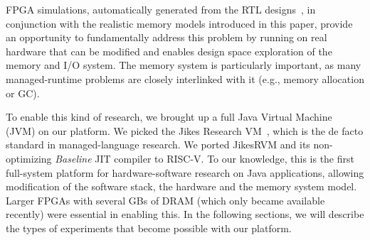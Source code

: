 FPGA simulations, automatically generated from the RTL designs~\cite{strober},
in conjunction with the realistic memory models introduced in this paper,
provide an opportunity to fundamentally address this problem by running on real
hardware that can be modified and enables design space exploration of the
memory and I/O system. The memory system is particularly important, as many
managed-runtime problems are closely interlinked with it (e.g., memory
allocation or GC).

To enable this kind of research, we brought up a full Java Virtual Machine
(JVM) on our platform. We picked the Jikes Research
VM~\cite{alpern_jikes_2005}, which is the de facto standard in managed-language
research. We ported JikesRVM and its non-optimizing \emph{Baseline} JIT
compiler to RISC-V. To our knowledge, this is the first full-system platform
for hardware-software research on Java applications, allowing modification of
the software stack, the hardware and the memory system model. Larger FPGAs with
several GBs of DRAM (which only became available recently) were essential in
enabling this. In the following sections, we will describe the types of
experiments that become possible with our platform.


